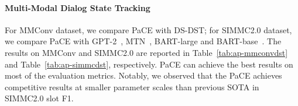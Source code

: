 \documentclass[11pt]{article}
\begin{document}
\begin{table}[t!]
    \centering
    \small
    \caption{
    Multi-modal dialogue retrieval on PhotoChat.
    }
    \label{tab:ap-retrieval-photochat}
\end{table}

\begin{table}[t!]
    \centering
    \small
    \caption{
    Multi-modal dialog retrieval on Image-Chat.
    }
    \label{tab:ap-image-chat}
\end{table}

\vspace{-0.3mm}
\paragraph{Multi-Modal Dialog State Tracking}
For MMConv dataset, we compare PaCE with DS-DST\citep{zhang2019find}; for SIMMC2.0 dataset, we compare PaCE with GPT-2~\citep{radford2019language}, MTN~\citep{le2019multimodal}, BART-large and BART-base~\citep{lewis2019bart}. The results on MMConv and SIMMC2.0 are reported in Table~\ref{tab:ap-mmconvdst} and Table~\ref{tab:ap-simmcdst}, respectively.  
PaCE can achieve the best results on most of the evaluation metrics. 
Notably, we observed that the PaCE achieves competitive results at smaller parameter scales than previous SOTA in SIMMC2.0 slot F1.
\end{document}
